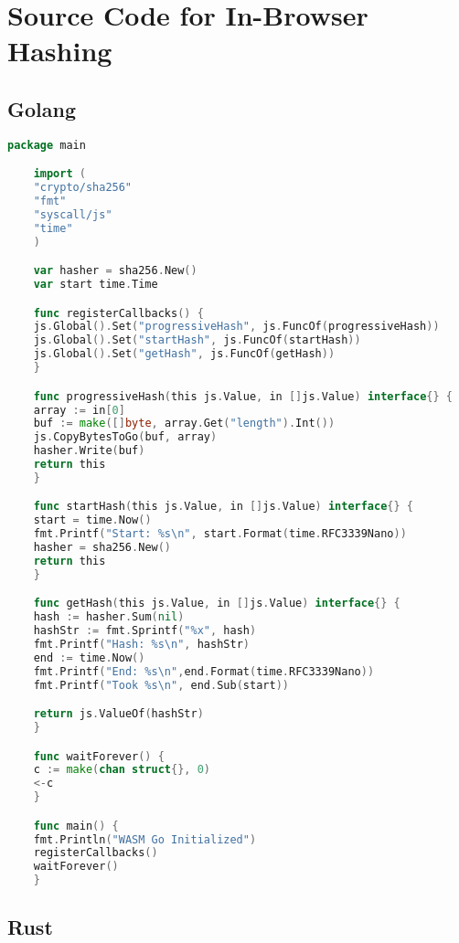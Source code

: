 \chapter{Source Code for In-Browser Hashing}\label{ch:in-browser-hashing-code}

\section{Golang}\label{sec:golang}

\begin{lstlisting}[language=Go]
    package main

    import (
    "crypto/sha256"
    "fmt"
    "syscall/js"
    "time"
    )

    var hasher = sha256.New()
    var start time.Time

    func registerCallbacks() {
    js.Global().Set("progressiveHash", js.FuncOf(progressiveHash))
    js.Global().Set("startHash", js.FuncOf(startHash))
    js.Global().Set("getHash", js.FuncOf(getHash))
    }

    func progressiveHash(this js.Value, in []js.Value) interface{} {
    array := in[0]
    buf := make([]byte, array.Get("length").Int())
    js.CopyBytesToGo(buf, array)
    hasher.Write(buf)
    return this
    }

    func startHash(this js.Value, in []js.Value) interface{} {
    start = time.Now()
    fmt.Printf("Start: %s\n", start.Format(time.RFC3339Nano))
    hasher = sha256.New()
    return this
    }

    func getHash(this js.Value, in []js.Value) interface{} {
    hash := hasher.Sum(nil)
    hashStr := fmt.Sprintf("%x", hash)
    fmt.Printf("Hash: %s\n", hashStr)
    end := time.Now()
    fmt.Printf("End: %s\n",end.Format(time.RFC3339Nano))
    fmt.Printf("Took %s\n", end.Sub(start))

    return js.ValueOf(hashStr)
    }

    func waitForever() {
    c := make(chan struct{}, 0)
    <-c
    }

    func main() {
    fmt.Println("WASM Go Initialized")
    registerCallbacks()
    waitForever()
    }
\end{lstlisting}


\section{Rust}

